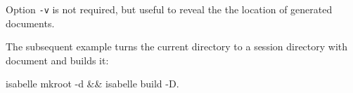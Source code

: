 \begin{isabellebody}
\begin{isamarkuptext}
  Option \verb|-v| is not required, but useful to reveal the
  the location of generated documents.

  \medskip The subsequent example turns the current directory to a
  session directory with document and builds it:
\begin{ttbox}
isabelle mkroot -d && isabelle build -D.
\end{ttbox}%
\end{isamarkuptext}%
\isamarkuptrue%
%
\isadelimtheory
%
\endisadelimtheory
%
\isatagtheory
{}\isamarkupfalse%
%
\endisatagtheory
{\isafoldtheory}%
%
\isadelimtheory
%
\endisadelimtheory
\isanewline
\end{isabellebody}%
